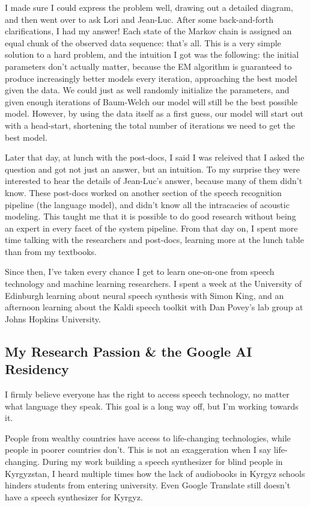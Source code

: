\documentclass[12pt,a4paper]{article}
\begin{document}
I made sure I could express the problem well, drawing out a detailed diagram, and then went over to ask Lori and Jean-Luc. After some back-and-forth clarifications, I had my answer! Each state of the Markov chain is assigned an equal chunk of the observed data sequence: that's all. This is a very simple solution to a hard problem, and the intuition I got was the following: the initial parameters don't actually matter, because the EM algorithm is guaranteed to produce increasingly better models every iteration, approaching the best model given the data. We could just as well randomly initialize the parameters, and given enough iterations of Baum-Welch our model will still be the best possible model. However, by using the data itself as a first guess, our model will start out with a head-start, shortening the total number of iterations we need to get the best model. 

Later that day, at lunch with the post-docs, I said I was releived that I asked the question and got not just an answer, but an intuition. To my surprise they were interested to hear the details of Jean-Luc's answer, because many of them didn't know. These post-docs worked on another section of the speech recognition pipeline (the language model), and didn't know all the intracacies of acoustic modeling. This taught me that it is possible to do good research without being an expert in every facet of the system pipeline. From that day on, I spent more time talking with the researchers and post-docs, learning more at the lunch table than from my textbooks.

Since then, I've taken every chance I get to learn one-on-one from speech technology and machine learning researchers. I spent a week at the University of Edinburgh learning about neural speech synthesis with Simon King, and an afternoon learning about the Kaldi speech toolkit with Dan Povey's lab group at Johns Hopkins University.


\subsection*{My Research Passion \& the Google AI Residency}

I firmly believe everyone has the right to access speech technology, no matter what language they speak. This goal is a long way off, but I'm working towards it.

People from wealthy countries have access to life-changing technologies, while people in poorer countries don't. This is not an exaggeration when I say life-changing. During my work building a speech synthesizer for blind people in Kyrgyzstan, I heard multiple times how the lack of audiobooks in Kyrgyz schools hinders students from entering university. Even Google Translate still doesn't have a speech synthesizer for Kyrgyz.
\end{document}
